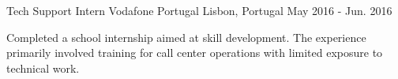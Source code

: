 \begin{cventries}
  \vspace{0.4cm}


  \cventry
  {Tech Support Intern} %
  {Vodafone Portugal} %
  {Lisbon, Portugal} %
  {May 2016 - Jun. 2016} %
  { %
    \begin{cvitems}
      \item {Completed a school internship aimed at skill development. The experience primarily involved training for call center operations with limited exposure to technical work.}
    \end{cvitems}
  }

  \vspace{0.4cm}


\end{cventries}
